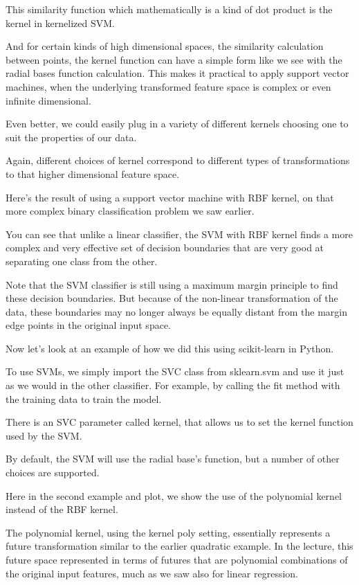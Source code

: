 \begin{multicols}{2}
This similarity function which mathematically is a kind of dot product is the kernel in kernelized SVM. 

And for certain kinds of high dimensional spaces, the similarity calculation between points, the kernel function can have a simple form like we see with the radial bases function calculation. This makes it practical to apply support vector machines, when the underlying transformed feature space is complex or even infinite dimensional. 

Even better, we could easily plug in a variety of different kernels choosing one to suit the properties of our data. 

Again, different choices of kernel correspond to different types of transformations to that higher dimensional feature space. 

Here's the result of using a support vector machine with RBF kernel, on that more complex binary classification problem we saw earlier. 

You can see that unlike a linear classifier, the SVM with RBF kernel finds a more complex and very effective set of decision boundaries that are very good at separating one class from the other. 

Note that the SVM classifier is still using a maximum margin principle to find these decision boundaries. But because of the non-linear transformation of the data, these boundaries may no longer always be equally distant from the margin edge points in the original input space. 

Now let's look at an example of how we did this using scikit-learn in Python. 

To use SVMs, we simply import the SVC class from sklearn.svm and use it just as we would in the other classifier. For example, by calling the fit method with the training data to train the model. 

There is an SVC parameter called kernel, that allows us to set the kernel function used by the SVM. 

By default, the SVM will use the radial base's function, but a number of other choices are supported. 

Here in the second example and plot, we show the use of the polynomial kernel instead of the RBF kernel. 

The polynomial kernel, using the kernel poly setting, essentially represents a future transformation similar to the earlier quadratic example. In the lecture, this future space represented in terms of futures that are polynomial combinations of the original input features, much as we saw also for linear regression. 


\end{multicols}
